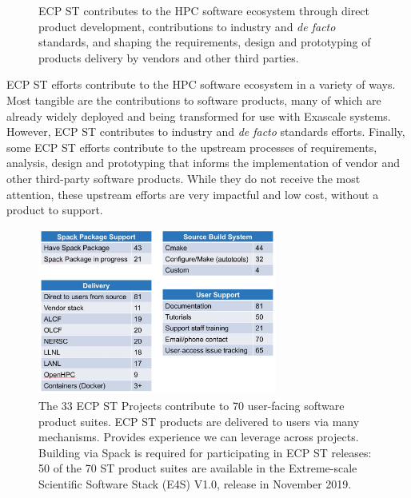 \begin{figure}
	\begin{mdframed}
		\large{ECP ST contributes to the HPC software ecosystem through direct product development, contributions to industry and \textit{de facto} standards, and shaping the requirements, design and prototyping of products delivery by vendors and other third parties.}
	\end{mdframed}
\end{figure}
ECP ST efforts contribute to the HPC software ecosystem in a variety of ways.  Most tangible are the contributions to software products, many of which are already widely deployed and being transformed for use with Exascale systems.  However, ECP ST contributes to industry and \textit{de facto} standards efforts.  Finally, some ECP ST efforts contribute to the upstream processes of requirements, analysis, design and prototyping that informs the implementation of vendor and other third-party software products.  While they do not receive the most attention, these upstream efforts are very impactful and low cost, without a product to support.

\begin{figure}[htb]
	\begin{center}
		\includegraphics[width=0.7\textwidth]{ProductsOverview}

		\caption{\label{fig:productsoverview}{\small{The 33 ECP ST Projects contribute to 70 user-facing software product suites.   ECP ST products are delivered to users via many mechanisms. Provides experience we can leverage across projects.  Building via Spack is required for participating in ECP ST releases: 50 of the 70 ST product suites are available in the Extreme-scale Scientific Software Stack (E4S) V1.0, release in November 2019.}}}
	\end{center}
\end{figure}
